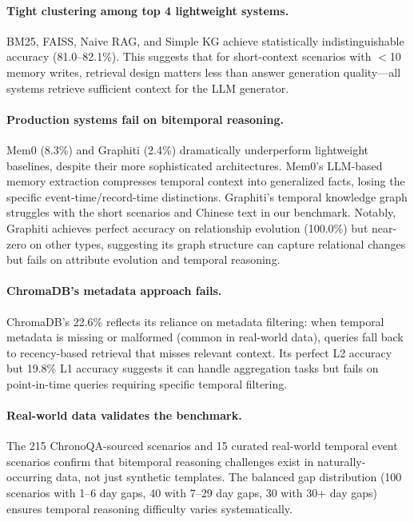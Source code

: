 \paragraph{Tight clustering among top 4 lightweight systems.}
BM25, FAISS, Naive RAG, and Simple KG achieve statistically indistinguishable accuracy (81.0--82.1\%).
This suggests that for short-context scenarios with $<$10 memory writes, retrieval design matters less than answer generation quality---all systems retrieve sufficient context for the LLM generator.

\paragraph{Production systems fail on bitemporal reasoning.}
Mem0 (8.3\%) and Graphiti (2.4\%) dramatically underperform lightweight baselines, despite their more sophisticated architectures.
Mem0's LLM-based memory extraction compresses temporal context into generalized facts, losing the specific event-time/record-time distinctions.
Graphiti's temporal knowledge graph struggles with the short scenarios and Chinese text in our benchmark.
Notably, Graphiti achieves perfect accuracy on relationship evolution (100.0\%) but near-zero on other types, suggesting its graph structure can capture relational changes but fails on attribute evolution and temporal reasoning.

\paragraph{ChromaDB's metadata approach fails.}
ChromaDB's 22.6\% reflects its reliance on metadata filtering: when temporal metadata is missing or malformed (common in real-world data), queries fall back to recency-based retrieval that misses relevant context.
Its perfect L2 accuracy but 19.8\% L1 accuracy suggests it can handle aggregation tasks but fails on point-in-time queries requiring specific temporal filtering.

\paragraph{Real-world data validates the benchmark.}
The 215 ChronoQA-sourced scenarios and 15 curated real-world temporal event scenarios confirm that bitemporal reasoning challenges exist in naturally-occurring data, not just synthetic templates.
The balanced gap distribution (100 scenarios with 1--6 day gaps, 40 with 7--29 day gaps, 30 with 30+ day gaps) ensures temporal reasoning difficulty varies systematically.

